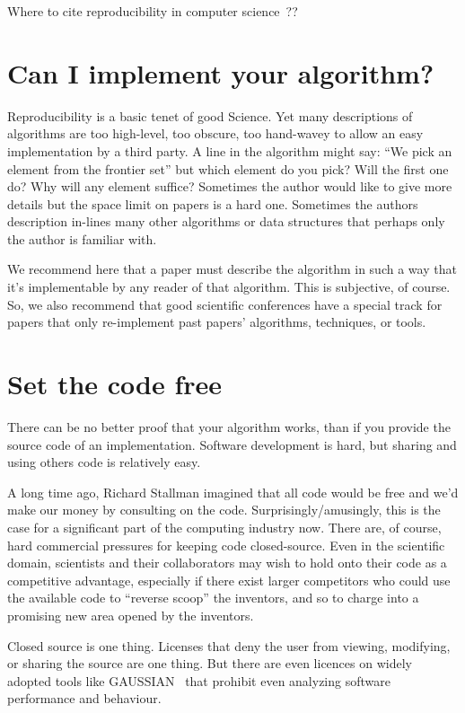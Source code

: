 \documentclass[conference]{IEEEtran}
\begin{document}
Where to cite reproducibility in computer science~\cite{collberg-et-al:2014}??


\section{Can I implement your algorithm?}

Reproducibility is a basic tenet of good Science. Yet many
descriptions of algorithms are too high-level, too obscure, too
hand-wavey to allow an easy implementation by a third party. A line in
the algorithm might say: ``We pick an element from the frontier set''
but which element do you pick? Will the first one do? Why will any
element suffice? Sometimes the author would like to give more details
but the space limit on papers is a hard one. Sometimes the authors
description in-lines many other algorithms or data structures that
perhaps only the author is familiar with.

We recommend here that a paper must describe the algorithm in such a
way that it's implementable by any reader of that algorithm. This is
subjective, of course. So, we also recommend that good scientific
conferences have a special track for papers that only re-implement
past papers' algorithms, techniques, or tools.


\section{Set the code free} 

There can be no better proof that your algorithm works, than if you
provide the source code of an implementation. Software development is
hard, but sharing and using others code is relatively easy.

A long time ago, Richard Stallman imagined that all code would be free
and we'd make our money by consulting on the code.
Surprisingly/amusingly, this is the case for a significant part of the
computing industry now. There are, of course, hard commercial
pressures for keeping code closed-source. Even in the scientific
domain, scientists and their collaborators may wish to hold onto their
code as a competitive advantage, especially if there exist larger
competitors who could use the available code to ``reverse scoop'' the
inventors, and so to charge into a promising new area opened by the
inventors.

Closed source is one thing. Licenses that deny the user from viewing,
modifying, or sharing the source are one thing. But there are even
licences on widely adopted tools like GAUSSIAN~\cite{Giles2004} that
prohibit even analyzing software performance and behaviour.
 
\end{document}
